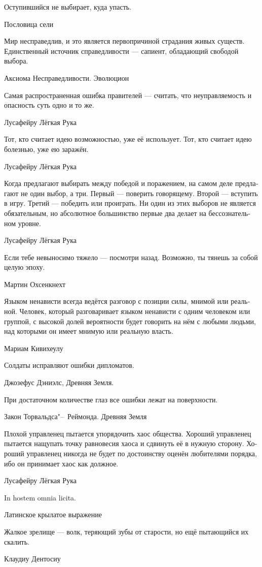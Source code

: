 \documentclass[a4paper,12pt,fleqn]{book}\usepackage{polyglossia}\setdefaultlanguage[babelshorthands=true]{russian}\setotherlanguage{english}\defaultfontfeatures{Ligatures=TeX,Mapping=tex-text}\usepackage{xcolor}\newcommand{\ml}[3]{#2}
\begin{document}
{\epigraph{
\ml{$0$}
{Оступившийся не выбирает, куда упасть.}
{A tripped one can't choose the place to fall.}
}{Пословица сели}

\epigraph
{Мир несправедлив, и это является первопричиной страдания живых существ.
Единственный источник справедливости --- сапиент, обладающий свободой выбора.}
{Аксиома Несправедливости. Эволюцион}

\epigraph
{Самая распространенная ошибка правителей --- считать, что неуправляемость и опасность суть одно и то же.}
{Лусафейру Лёгкая Рука}

\epigraph{
\ml{$0$}
{Тот, кто считает идею возможностью, уже её использует.}
{The one who treats an idea as an opportunity, already uses it.}
\ml{$0$}
{Тот, кто считает идею болезнью, уже ею заражён.}
{The one who treats an idea as a disease, is already infected.}
}{Лусафейру Лёгкая Рука}

\epigraph
{Когда предлагают выбирать между победой и поражением, на самом деле предлагают не один выбор, а три.
Первый --- поверить говорящему.
Второй --- вступить в игру.
Третий --- победить или проиграть.
Ни один из этих выборов не является обязательным, но абсолютное большинство первые два делает на бессознательном уровне.}
{Лусафейру Лёгкая Рука}

\epigraph
{Если тебе невыносимо тяжело --- посмотри назад.
Возможно, ты тянешь за собой целую эпоху.}
{Мартин Охсенкнехт}

\epigraph
{Языком ненависти всегда ведётся разговор с позиции силы, мнимой или реальной.
Человек, который разговаривает языком ненависти с одним человеком или группой, с высокой долей вероятности будет говорить на нём с любыми людьми, над которыми он имеет мнимую или реальную власть.}
{Мариам Кивихеулу}

\epigraph
{Солдаты исправляют ошибки дипломатов.}
{Джозефус Дэниэлс, Древняя Земля.}

\epigraph
{При достаточном количестве глаз все ошибки лежат на поверхности.}
{Закон Торвальдса"--~Реймонда. Древняя Земля}

\epigraph
{Плохой управленец пытается упорядочить хаос общества.
Хороший управленец пытается нащупать точку равновесия хаоса и сдвинуть её в нужную сторону.
Хороший управленец никогда не будет по достоинству оценён любителями порядка, ибо он принимает хаос как должное.}
{Лусафейру Лёгкая Рука}

\epigraph
{In hostem omnia licita.}
{Латинское крылатое выражение}

\epigraph
{Жалкое зрелище --- волк, теряющий зубы от старости, но ещё пытающийся их скалить.}
{Клаудиу Дентосиу}

}
\end{document}
